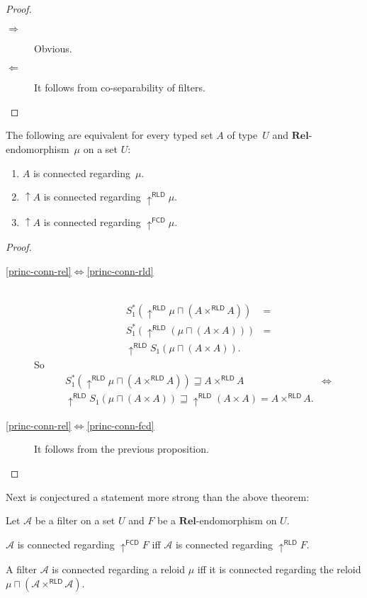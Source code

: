 \begin{proof}
~
\begin{description}
\item [{$\Rightarrow$}] Obvious.
\item [{$\Leftarrow$}] It follows from co-separability of filters.
\end{description}
\end{proof}
\begin{thm}
The following are equivalent for every typed set $A$ of type~$U$
and $\mathbf{Rel}$-endomorphism~$\mu$ on a set $U$:
\begin{enumerate}
\item \label{princ-conn-rel}$A$ is connected regarding~$\mu$.
\item \label{princ-conn-rld}$\uparrow A$ is connected regarding $\uparrow^{\mathsf{RLD}}\mu$.
\item \label{princ-conn-fcd}$\uparrow A$ is connected regarding $\uparrow^{\mathsf{FCD}}\mu$.
\end{enumerate}
\end{thm}
\begin{proof}
~
\begin{description}
\item [{\ref{princ-conn-rel}$\Leftrightarrow$\ref{princ-conn-rld}}] ~
\begin{align*}
S^{\ast}_1(\uparrow^{\mathsf{RLD}}\mu\sqcap(A\times^{\mathsf{RLD}}A)) & =\\
S^{\ast}_1(\uparrow^{\mathsf{RLD}}(\mu\sqcap(A\times A))) & =\\
\uparrow^{\mathsf{RLD}}S_1(\mu\sqcap(A\times A)).
\end{align*}
So
\begin{align*}
S^{\ast}_1(\uparrow^{\mathsf{RLD}}\mu\sqcap(A\times^{\mathsf{RLD}}A))\sqsupseteq A\times^{\mathsf{RLD}}A & \Leftrightarrow\\
\uparrow^{\mathsf{RLD}}S_1(\mu\sqcap(A\times A))\sqsupseteq\uparrow^{\mathsf{RLD}}(A\times A)=A\times^{\mathsf{RLD}}A.
\end{align*}

\item [{\ref{princ-conn-rel}$\Leftrightarrow$\ref{princ-conn-fcd}}] It
follows from the previous proposition.
\end{description}
\end{proof}
Next is conjectured a statement more strong than the above theorem:
\begin{conjecture}
Let $\mathcal{A}$ be a filter on a set $U$ and $F$ be a $\mathbf{Rel}$-endomorphism
on $U$.

$\mathcal{A}$ is connected regarding $\uparrow^{\mathsf{FCD}}F$
iff $\mathcal{A}$ is connected regarding $\uparrow^{\mathsf{RLD}}F$.\end{conjecture}
\begin{obvious}
A filter $\mathcal{A}$ is connected regarding a reloid $\mu$ iff
it is connected regarding the reloid $\mu\sqcap(\mathcal{A}\times^{\mathsf{RLD}}\mathcal{A})$.
\end{obvious}

